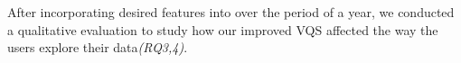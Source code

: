 \par After incorporating desired features into \zv over the period of a year, we conducted a qualitative evaluation to study how our improved VQS affected the way the users explore their data{\em (RQ3,4)}. 